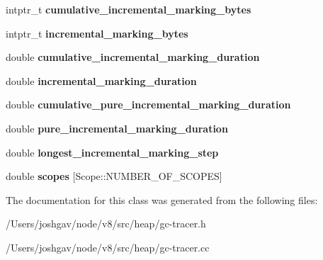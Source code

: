 \begin{DoxyCompactItemize}
\item 
intptr\+\_\+t {\bfseries cumulative\+\_\+incremental\+\_\+marking\+\_\+bytes}\hypertarget{classv8_1_1internal_1_1_g_c_tracer_1_1_event_ad2d4b245751173527573ed9773dcecfe}{}\label{classv8_1_1internal_1_1_g_c_tracer_1_1_event_ad2d4b245751173527573ed9773dcecfe}

\item 
intptr\+\_\+t {\bfseries incremental\+\_\+marking\+\_\+bytes}\hypertarget{classv8_1_1internal_1_1_g_c_tracer_1_1_event_a8f884a484eaa06898253d1149503582a}{}\label{classv8_1_1internal_1_1_g_c_tracer_1_1_event_a8f884a484eaa06898253d1149503582a}

\item 
double {\bfseries cumulative\+\_\+incremental\+\_\+marking\+\_\+duration}\hypertarget{classv8_1_1internal_1_1_g_c_tracer_1_1_event_a24a8d3d6a0ee5c0d7fe545a2a664b6a0}{}\label{classv8_1_1internal_1_1_g_c_tracer_1_1_event_a24a8d3d6a0ee5c0d7fe545a2a664b6a0}

\item 
double {\bfseries incremental\+\_\+marking\+\_\+duration}\hypertarget{classv8_1_1internal_1_1_g_c_tracer_1_1_event_abb2c3827a1615b7e15d0530a7b598679}{}\label{classv8_1_1internal_1_1_g_c_tracer_1_1_event_abb2c3827a1615b7e15d0530a7b598679}

\item 
double {\bfseries cumulative\+\_\+pure\+\_\+incremental\+\_\+marking\+\_\+duration}\hypertarget{classv8_1_1internal_1_1_g_c_tracer_1_1_event_a059d8f814f8ffaa7596cacdbd4660c5a}{}\label{classv8_1_1internal_1_1_g_c_tracer_1_1_event_a059d8f814f8ffaa7596cacdbd4660c5a}

\item 
double {\bfseries pure\+\_\+incremental\+\_\+marking\+\_\+duration}\hypertarget{classv8_1_1internal_1_1_g_c_tracer_1_1_event_a85ce46e2d272e1134f5ce23d59b9d610}{}\label{classv8_1_1internal_1_1_g_c_tracer_1_1_event_a85ce46e2d272e1134f5ce23d59b9d610}

\item 
double {\bfseries longest\+\_\+incremental\+\_\+marking\+\_\+step}\hypertarget{classv8_1_1internal_1_1_g_c_tracer_1_1_event_a43de71f2911958f61fa127510a65094e}{}\label{classv8_1_1internal_1_1_g_c_tracer_1_1_event_a43de71f2911958f61fa127510a65094e}

\item 
double {\bfseries scopes} \mbox{[}Scope\+::\+N\+U\+M\+B\+E\+R\+\_\+\+O\+F\+\_\+\+S\+C\+O\+P\+ES\mbox{]}\hypertarget{classv8_1_1internal_1_1_g_c_tracer_1_1_event_add05c317c9067e4b3d6fce6ce114a802}{}\label{classv8_1_1internal_1_1_g_c_tracer_1_1_event_add05c317c9067e4b3d6fce6ce114a802}

\end{DoxyCompactItemize}


The documentation for this class was generated from the following files\+:\begin{DoxyCompactItemize}
\item 
/\+Users/joshgav/node/v8/src/heap/gc-\/tracer.\+h\item 
/\+Users/joshgav/node/v8/src/heap/gc-\/tracer.\+cc\end{DoxyCompactItemize}
